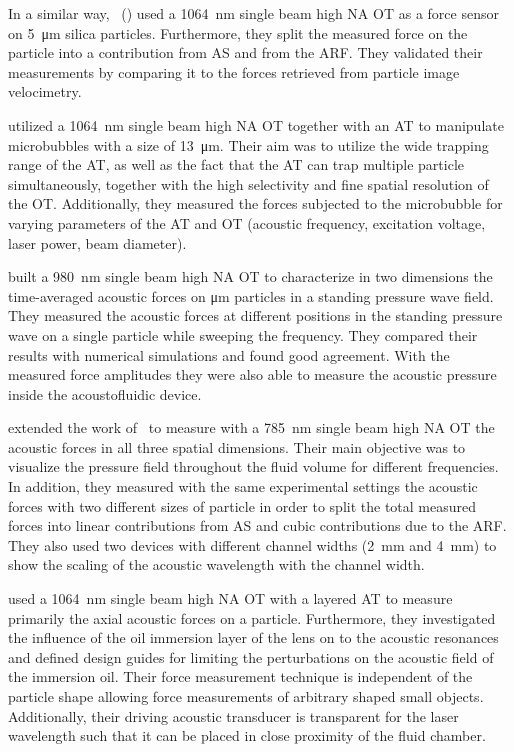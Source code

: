 In a similar way, ~(\citeyear{Bassindale2014}) used a 
\SI{1064}{\nm} single beam high NA OT as a force sensor on \SI{5}{\um} silica 
particles. Furthermore, they split the measured force on the particle into a 
contribution from AS and from the ARF. They validated their measurements by 
comparing it to the forces retrieved from particle image velocimetry.

 utilized a \SI{1064}{\nm} single beam high NA OT together with 
an AT to manipulate microbubbles with a size of \SI{13}{\um}. Their aim was to 
utilize the wide trapping range of the AT, as well as the fact that the AT can 
trap multiple particle simultaneously, together with the high selectivity and 
fine spatial resolution of the OT. Additionally, they measured the forces 
subjected to the microbubble for varying parameters of the AT and OT (acoustic 
frequency, excitation voltage, laser power, beam diameter).

 built a \SI{980}{\nm} single beam high NA OT to 
characterize in two dimensions the time-averaged acoustic forces on \si{\um} 
particles in a standing pressure wave field. They measured the acoustic forces 
at different positions in the standing pressure wave on a single particle while 
sweeping the frequency. They compared their results with numerical simulations 
and found good agreement. With the measured force amplitudes they were also 
able to measure the acoustic pressure inside the acoustofluidic device.

 extended the work of~\cite{Lakaemper2015} to measure with 
a \SI{785}{\nm} single beam high NA OT the acoustic forces in all three spatial 
dimensions. Their main objective was to visualize the pressure field throughout 
the fluid volume for different frequencies. In addition, they measured with the 
same experimental settings the acoustic forces with two different sizes of 
particle in order to split the total measured forces into linear contributions 
from AS and cubic contributions due to the ARF. They also used two devices with 
different channel widths (\SI{2}{\mm} and \SI{4}{\mm}) to show the scaling of 
the acoustic wavelength with the channel width.

 used a \SI{1064}{\nm} single beam high NA OT with a 
layered AT to measure primarily the axial acoustic forces on a particle. 
Furthermore, they investigated the influence of the oil immersion layer of the 
lens on to the acoustic resonances and defined design guides for limiting the 
perturbations on the acoustic field of the immersion oil. Their force 
measurement technique is independent of the particle shape allowing force 
measurements of arbitrary shaped small objects. Additionally, their driving 
acoustic transducer is transparent for the laser wavelength such that it can be 
placed in close proximity of the fluid chamber.


